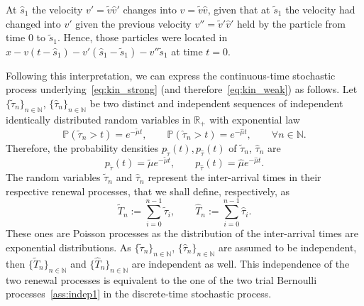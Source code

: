 \documentclass[a4paper]{article}
\theoremstyle{Theorem}\newtheorem{proposition}{Proposition}[section]
\theoremstyle{Remark}\newtheorem{remark}{Remark}[section]
\theoremstyle{Theorem}\newtheorem{theorem}{Theorem}[section]
\newcommand{\R}{\mathbb{R}}
\newcommand{\hv}{\hat{v}}
\newcommand{\tv}{\tilde{v}}
\newcommand{\hmu}{\hat{\mu}}
\newcommand{\tmu}{\tilde{\mu}}
\begin{document}
At $\hat{s}_1$ the velocity $v'=\tv \hv'$ changes into $v=\tv \hv$, given that at $\tilde{s}_1$ the velocity had changed into $v'$ given the previous velocity $v''= \tv' \hv'$ held by the particle from time $0$ to $\tilde{s}_1$. Hence, those particles were located in $x-v(t-\hat{s}_1)-v'(\hat{s}_1-\tilde{s}_1)-v''\tilde{s}_1$ at time $t=0$. 

Following this interpretation, we can express the continuous-time stochastic process underlying~\eqref{eq:kin_strong} (and therefore~\eqref{eq:kin_weak}) as follows. 
Let $\lbrace \tilde{\tau}_n\rbrace_{n \in \mathbb{N}}$, $\lbrace \hat{\tau}_n\rbrace_{n \in \mathbb{N}}$ be two distinct and independent  sequences of independent identically distributed random variables in $\R_+$ with exponential law
\[
\mathbb{P}(\tilde{\tau}_n >t) = e^{-\tmu t}, \qquad \mathbb{P}(\hat{\tau}_n >t) = e^{-\hmu t}, \qquad \forall n \in \mathbb{N}.
\]
Therefore, the probability densities $p_{\tilde{\tau}}(t), p_{\hat{\tau}}(t)$ of $\tilde{\tau}_n$, $\hat{\tau}_n$ are
\[
p_{\tilde{\tau}}(t)=\tmu e^{-\tmu t}, \qquad p_{\hat{\tau}}(t)= \hmu e ^{-\hmu t}.
\]
The random variables $\tilde{\tau}_n$ and $\hat{\tau}_n$ represent the inter-arrival times in their respective renewal processes, that we shall define, respectively, as
\[
\tilde{T}_n := \sum_{i=0}^{n-1} \tilde{\tau}_i, \qquad \hat{T}_n := \sum_{i=0}^{n-1} \hat{\tau}_i.
\]
These ones are Poisson processes as the distribution of the inter-arrival times are exponential distributions.
As $\lbrace \tilde{\tau}_n\rbrace_{n \in \mathbb{N}}$, $\lbrace \hat{\tau}_n\rbrace_{n \in \mathbb{N}}$ are assumed to be independent, then $\lbrace \tilde{T}_n\rbrace_{n \in \mathbb{N}}$ and $\lbrace \hat{T}_n\rbrace_{n \in \mathbb{N}}$ are independent as well. This independence of the two renewal processes is equivalent to the one of the two trial Bernoulli processes~\eqref{ass:indep1} in the discrete-time stochastic process.
\end{document}
